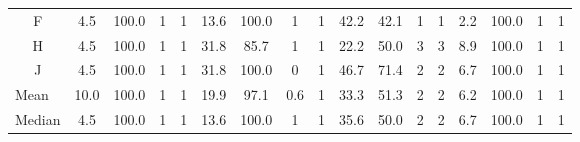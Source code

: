 \begin{landscape}
\begin{table}[p]
\begin{tabular}{@{}ccccccccccccccccc@{}}
      \multicolumn{1}{c|}{F}              & 4.5  & 100.0 & 1    & \multicolumn{1}{c|}{1}    & 13.6                     & 100.0                    & 1                        & \multicolumn{1}{c|}{1}    & 42.2 & 42.1                     & 1                        & \multicolumn{1}{c|}{1}    & 2.2                      & 100.0                    & 1                        & 1                        \\
      \multicolumn{1}{c|}{H}              & 4.5  & 100.0 & 1    & \multicolumn{1}{c|}{1}    & 31.8                     & 85.7                     & 1                        & \multicolumn{1}{c|}{1}    & 22.2 & 50.0                     & 3                        & \multicolumn{1}{c|}{3}    & 8.9                      & 100.0                    & 1                        & 1                        \\
      \multicolumn{1}{c|}{J}              & 4.5  & 100.0 & 1    & \multicolumn{1}{c|}{1}    & 31.8                     & 100.0                    & 0                        & \multicolumn{1}{c|}{1}    & 46.7 & 71.4                     & 2                        & \multicolumn{1}{c|}{2}    & 6.7                      & 100.0                    & 1                        & 1                        \\ \midrule
      \multicolumn{1}{l|}{Mean}           & 10.0 & 100.0 & 1    & \multicolumn{1}{c|}{1}    & 19.9                     & 97.1                     & 0.6                      & \multicolumn{1}{c|}{1}    & 33.3 & 51.3                     & 2                        & \multicolumn{1}{c|}{2}    & 6.2                      & 100.0                    & 1                        & 1                        \\
      \multicolumn{1}{l|}{Median}         & 4.5  & 100.0 & 1    & \multicolumn{1}{c|}{1}    & 13.6                     & 100.0                    & 1                        & \multicolumn{1}{c|}{1}    & 35.6 & 50.0                     & 2                        & \multicolumn{1}{c|}{2}    & 6.7                      & 100.0                    & 1                        & 1                        \\ \bottomrule
    \end{tabular}
    \label{tab:Results-Quantitative-BA}
  \end{table}
\end{landscape}

